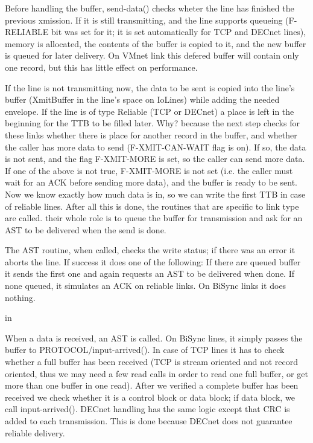Before handling the buffer, send-data() checks wheter  the  line  has
finished  the  previous  xmission.  If it is still transmitting, and the
line supports queueing (F-RELIABLE  bit  was  set  for  it;  it  is  set
automatically  for  TCP  and  DECnet  lines),  memory  is allocated, the
contents of the buffer is copied to it, and the new buffer is queued for
later  delivery. On VMnet link this defered buffer will contain only one
record, but this has little effect on performance.

If the line is not transmitting now, the data to be  sent  is  copied
into the line's buffer (XmitBuffer in the line's space on IoLines) while
adding the needed envelope. If the line is  of  type  Reliable  (TCP  or
DECnet) a place is left in the beginning for the TTB to be filled later.
Why? because the next step checks for these links whether there is place
for  another  record in the buffer, and whether the caller has more data
to send (F-XMIT-CAN-WAIT flag is on). If so, the data is not  sent,  and
the flag F-XMIT-MORE is set, so the caller can send more data. If one of
the above is not true, F-XMIT-MORE is not set (i.e. the caller must wait
for  an  ACK  before  sending  more data), and the buffer is ready to be
sent. Now we know exactly how much data is in, so we can write the first
TTB in case of reliable lines. After all this is done, the routines that
are specific to link type are called. their whole role is to  queue  the
buffer for transmission and ask for an AST to be delivered when the send
is done.

The AST routine, when called, checks the write status; if  there  was
an error it aborts the line. If success it does one of the following:
If  there are queued buffer it sends the first one and again requests an
AST to be delivered when done. If none queued, it simulates  an  ACK  on
reliable links. On BiSync links it does nothing.

 in

When a data is received, an AST is called. On BiSync lines, it simply
passes the buffer to PROTOCOL/input-arrived(). In case of TCP  lines  it
has  to  check  whether  a  full buffer has been received (TCP is stream
oriented and not record oriented, thus we may need a few read  calls  in
order to read one full buffer, or get more than one buffer in one read).
After we verified a complete buffer has been received we  check  whether
it   is  a  control  block  or  data  block;  if  data  block,  we  call
input-arrived(). DECnet handling has the same logic except that  CRC  is
added  to  each  transmission.  This  is  done  because  DECnet does not
guarantee reliable delivery.

